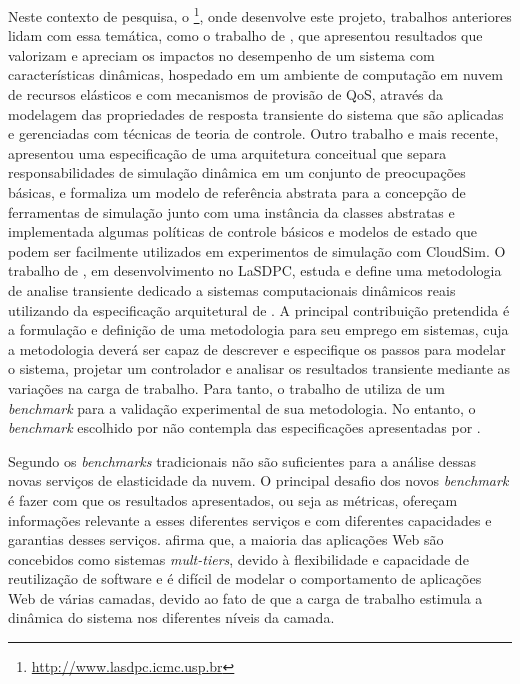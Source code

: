 Neste contexto de pesquisa, o \textit{}\footnote{\url{http://www.lasdpc.icmc.usp.br}}, onde desenvolve este projeto, trabalhos anteriores lidam com essa temática, como o trabalho de , que apresentou resultados que valorizam e apreciam os impactos no desempenho de um sistema com características dinâmicas, hospedado em um ambiente de computação em nuvem de recursos elásticos e com mecanismos de provisão de QoS, através da modelagem das propriedades de resposta transiente do sistema que são aplicadas e gerenciadas com  técnicas de teoria de controle. Outro trabalho e mais recente,  apresentou uma especificação de uma arquitetura conceitual que separa responsabilidades de simulação dinâmica em um conjunto de preocupações básicas, e formaliza um modelo de referência abstrata para a concepção de ferramentas de simulação junto com uma instância da classes abstratas e implementada algumas políticas de controle básicos e modelos de estado que podem ser facilmente utilizados em experimentos de simulação com CloudSim. O trabalho de , em desenvolvimento no LaSDPC, estuda e define uma metodologia de analise transiente dedicado a sistemas computacionais dinâmicos reais utilizando da especificação arquitetural de . A principal contribuição pretendida é a formulação e definição de uma metodologia para seu emprego em sistemas, cuja a metodologia deverá ser capaz de descrever e especifique os passos para modelar o sistema, projetar um controlador e analisar os resultados transiente mediante as variações na carga de trabalho. Para tanto, o trabalho de  utiliza de um \textit{benchmark} para a validação experimental de sua metodologia. No entanto, o \textit{benchmark} escolhido por  não contempla das especificações apresentadas por .

Segundo  os \textit{benchmarks} tradicionais não são suficientes para a análise dessas novas serviços de elasticidade da nuvem. O principal desafio dos novos \textit{benchmark} é fazer com que os resultados apresentados, ou seja as métricas, ofereçam informações relevante a esses diferentes serviços e com diferentes capacidades e garantias desses serviços.  afirma que, a maioria das aplicações Web são concebidos como sistemas \textit{mult-tiers}, devido à flexibilidade e capacidade de reutilização de software e é difícil de modelar o comportamento de aplicações Web de várias camadas, devido ao fato de que a carga de trabalho estimula a dinâmica do sistema nos diferentes níveis da camada.

